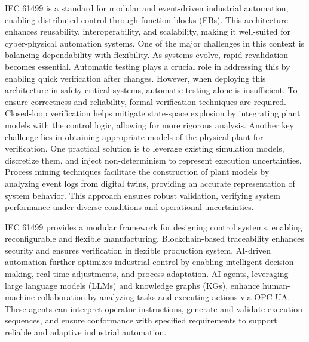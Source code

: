 IEC 61499 is a standard for modular and event-driven industrial automation, enabling distributed control through function blocks (FBs). This architecture enhances reusability, interoperability, and scalability, making it well-suited for cyber-physical automation systems. One of the major challenges in this context is balancing dependability with flexibility. As systems evolve, rapid revalidation becomes essential. Automatic testing plays a crucial role in addressing this by enabling quick verification after changes. However, when deploying this architecture in safety-critical systems, automatic testing alone is insufficient. To ensure correctness and reliability, formal verification techniques are required. Closed-loop verification helps mitigate state-space explosion by integrating plant models with the control logic, allowing for more rigorous analysis. Another key challenge lies in obtaining appropriate models of the physical plant for verification. One practical solution is to leverage existing simulation models, discretize them, and inject non-determinism to represent execution uncertainties. Process mining techniques facilitate the construction of plant models by analyzing event logs from digital twins, providing an accurate representation of system behavior. This approach ensures robust validation, verifying system performance under diverse conditions and operational uncertainties. 

IEC 61499 provides a modular framework for designing control systems, enabling reconfigurable and flexible manufacturing. Blockchain-based traceability enhances security and ensures verification in flexible production system. AI-driven automation further optimizes industrial control by enabling intelligent decision-making, real-time adjustments, and process adaptation. AI agents, leveraging large language models (LLMs) and knowledge graphs (KGs), enhance human-machine collaboration by analyzing tasks and executing actions via OPC UA. These agents can interpret operator instructions, generate and validate execution sequences, and ensure conformance with specified requirements to support reliable and adaptive industrial automation.